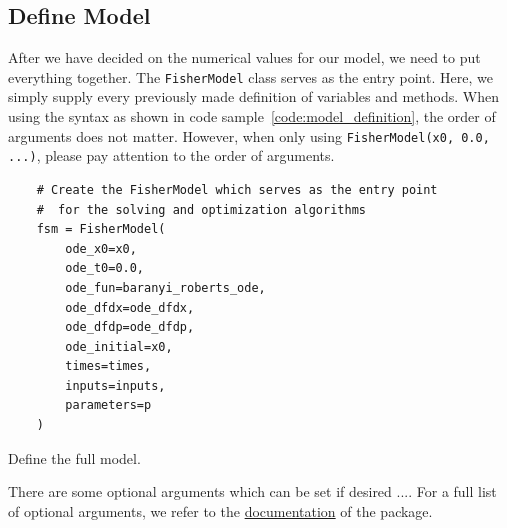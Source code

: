 \documentclass[10pt,A4paper]{article}
\begin{document}
\subsection*{Define Model}
After we have decided on the numerical values for our model, we need to put everything together.
The \texttt{FisherModel} class serves as the entry point.
Here, we simply supply every previously made definition of variables and methods.
When using the syntax as shown in code sample~\ref{code:model_definition}, the order of arguments does not matter.
However, when only using \texttt{FisherModel(x0, 0.0, ...)}, please pay attention to the order of arguments.
\begin{code}[H]
    \begin{verbatim}
    # Create the FisherModel which serves as the entry point
    #  for the solving and optimization algorithms
    fsm = FisherModel(
        ode_x0=x0,
        ode_t0=0.0,
        ode_fun=baranyi_roberts_ode,
        ode_dfdx=ode_dfdx,
        ode_dfdp=ode_dfdp,
        ode_initial=x0,
        times=times,
        inputs=inputs,
        parameters=p
    )
    \end{verbatim}
    \caption{Define the full model.}
    \label{code:model_definition}
\end{code}
There are some optional arguments which can be set if desired ....
For a full list of optional arguments, we refer to the \href{https://spatial-systems-biology-freiburg.github.io/Fishi/}{documentation} of the package.
%
\end{document}
